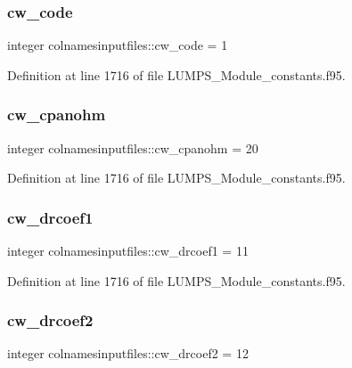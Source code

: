 \subsubsection{\texorpdfstring{cw\+\_\+code}{cw\_code}}
{\footnotesize\ttfamily integer colnamesinputfiles\+::cw\+\_\+code = 1}



Definition at line 1716 of file L\+U\+M\+P\+S\+\_\+\+Module\+\_\+constants.\+f95.

\mbox{\label{namespacecolnamesinputfiles_a72895e9c084cfee18f83ca866ff41964}} 
\subsubsection{\texorpdfstring{cw\+\_\+cpanohm}{cw\_cpanohm}}
{\footnotesize\ttfamily integer colnamesinputfiles\+::cw\+\_\+cpanohm = 20}



Definition at line 1716 of file L\+U\+M\+P\+S\+\_\+\+Module\+\_\+constants.\+f95.

\mbox{\label{namespacecolnamesinputfiles_ac4a304c5958bff88e372fa04cc7b2ed6}} 
\subsubsection{\texorpdfstring{cw\+\_\+drcoef1}{cw\_drcoef1}}
{\footnotesize\ttfamily integer colnamesinputfiles\+::cw\+\_\+drcoef1 = 11}



Definition at line 1716 of file L\+U\+M\+P\+S\+\_\+\+Module\+\_\+constants.\+f95.

\mbox{\label{namespacecolnamesinputfiles_ac3abc75f657224540af00dce3e12c31a}} 
\subsubsection{\texorpdfstring{cw\+\_\+drcoef2}{cw\_drcoef2}}
{\footnotesize\ttfamily integer colnamesinputfiles\+::cw\+\_\+drcoef2 = 12}



